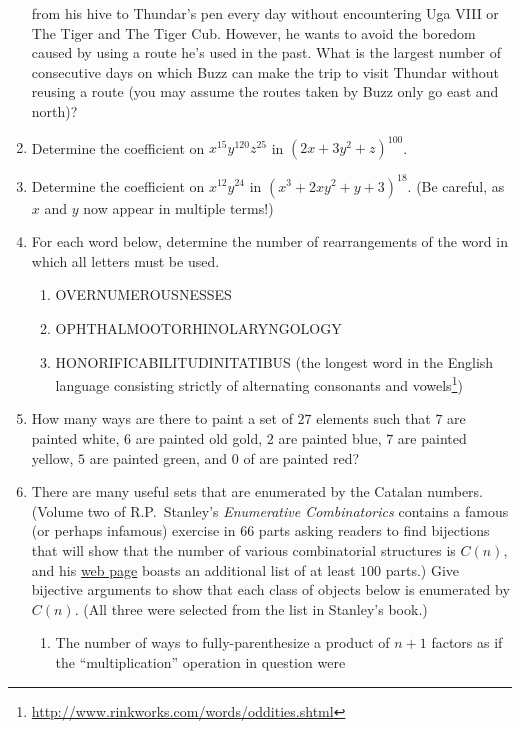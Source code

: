 \begin{enumerate}
    from his hive to Thundar's pen every day without encountering Uga
    VIII or The Tiger and The Tiger Cub. However, he wants to avoid
    the boredom caused by using a route he's used in the past. What is
    the largest number of consecutive days on which Buzz can make the
    trip to visit Thundar without reusing a route (you may assume
    the routes taken by Buzz only go east and north)?
  \item Determine the coefficient on $x^{15}y^{120}z^{25}$ in
    $(2x+3y^2+z)^{100}$.
  \item Determine the coefficient on $x^{12}y^{24}$ in
    $(x^3+2xy^2+y+3)^{18}$. (Be careful, as $x$ and $y$ now appear in
    multiple terms!)
  \item For each word below, determine the number of rearrangements of
    the word in which all letters must be used.
    \begin{enumerate}
    \item OVERNUMEROUSNESSES
    \item OPHTHALMOOTORHINOLARYNGOLOGY
    \item HONORIFICABILITUDINITATIBUS (the longest word in the English
      language consisting strictly of alternating consonants and vowels\footnote{\url{http://www.rinkworks.com/words/oddities.shtml}})
    \end{enumerate}
  \item How many ways are there to paint a set of $27$ elements such
    that $7$ are painted white, $6$ are painted old gold, $2$ are
    painted blue, $7$ are painted yellow, $5$ are painted green, and
    $0$ of are painted red?
  \item There are many useful sets that are enumerated by the Catalan
    numbers. (Volume two of R.P.~Stanley's \emph{Enumerative
      Combinatorics} contains a famous (or perhaps infamous) exercise
    in $66$ parts asking readers to find bijections that will show
    that the number of various combinatorial structures is $C(n)$, and
    his \href{http://www-math.mit.edu/~rstan/ec/catadd.pdf}{web page}
    boasts an additional list of at least $100$ parts.) Give bijective
    arguments to show that each class of objects below is enumerated
    by $C(n)$. (All three were selected from the list in Stanley's
    book.)
    \begin{enumerate}
    \item The number of ways to fully-parenthesize a product of $n+1$
      factors as if the ``multiplication'' operation in question were

\end{enumerate}
\end{enumerate}
